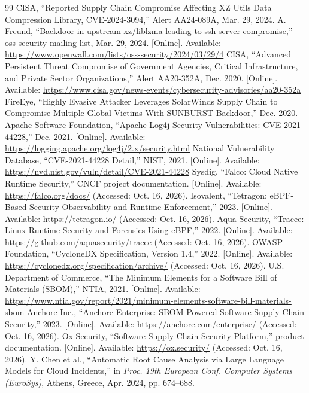 \documentclass[conference]{IEEEtran}
\begin{document}
\FloatBarrier
\clearpage
\begin{thebibliography}{99}
 CISA, ``Reported Supply Chain Compromise Affecting XZ Utils Data Compression Library, CVE-2024-3094,'' Alert AA24-089A, Mar. 29, 2024.
 A. Freund, ``Backdoor in upstream xz/liblzma leading to ssh server compromise,'' oss-security mailing list, Mar. 29, 2024. [Online]. Available: \url{https://www.openwall.com/lists/oss-security/2024/03/29/4}
 CISA, ``Advanced Persistent Threat Compromise of Government Agencies, Critical Infrastructure, and Private Sector Organizations,'' Alert AA20-352A, Dec. 2020. [Online]. Available: \url{https://www.cisa.gov/news-events/cybersecurity-advisories/aa20-352a}
 FireEye, ``Highly Evasive Attacker Leverages SolarWinds Supply Chain to Compromise Multiple Global Victims With SUNBURST Backdoor,'' Dec. 2020.
 Apache Software Foundation, ``Apache Log4j Security Vulnerabilities: CVE-2021-44228,'' Dec. 2021. [Online]. Available: \url{https://logging.apache.org/log4j/2.x/security.html}
 National Vulnerability Database, ``CVE-2021-44228 Detail,'' NIST, 2021. [Online]. Available: \url{https://nvd.nist.gov/vuln/detail/CVE-2021-44228}
 Sysdig, ``Falco: Cloud Native Runtime Security,'' CNCF project documentation. [Online]. Available: \url{https://falco.org/docs/} (Accessed: Oct. 16, 2026).
 Isovalent, ``Tetragon: eBPF-Based Security Observability and Runtime Enforcement,'' 2023. [Online]. Available: \url{https://tetragon.io/} (Accessed: Oct. 16, 2026).
 Aqua Security, ``Tracee: Linux Runtime Security and Forensics Using eBPF,'' 2022. [Online]. Available: \url{https://github.com/aquasecurity/tracee} (Accessed: Oct. 16, 2026).
 OWASP Foundation, ``CycloneDX Specification, Version 1.4,'' 2022. [Online]. Available: \url{https://cyclonedx.org/specification/archive/} (Accessed: Oct. 16, 2026).
 U.S. Department of Commerce, ``The Minimum Elements for a Software Bill of Materials (SBOM),'' NTIA, 2021. [Online]. Available: \url{https://www.ntia.gov/report/2021/minimum-elements-software-bill-materials-sbom}
 Anchore Inc., ``Anchore Enterprise: SBOM-Powered Software Supply Chain Security,'' 2023. [Online]. Available: \url{https://anchore.com/enterprise/} (Accessed: Oct. 16, 2026).
 Ox Security, ``Software Supply Chain Security Platform,'' product documentation. [Online]. Available: \url{https://ox.security/} (Accessed: Oct. 16, 2026).
 Y. Chen et al., ``Automatic Root Cause Analysis via Large Language Models for Cloud Incidents,'' in \emph{Proc. 19th European Conf. Computer Systems (EuroSys)}, Athens, Greece, Apr. 2024, pp. 674--688.

\end{thebibliography}
\end{document}
